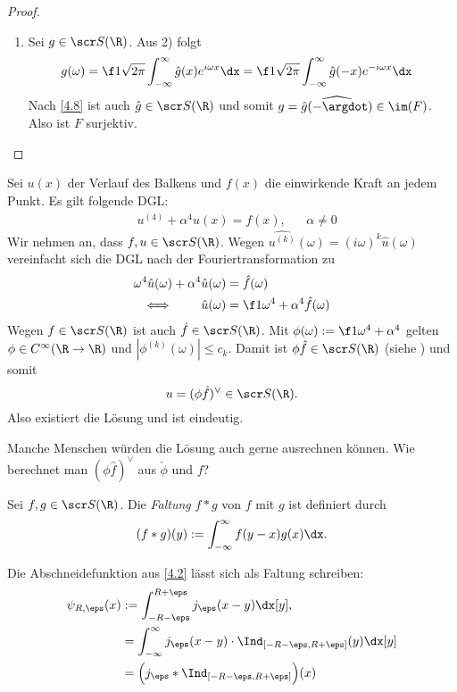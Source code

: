 \begin{st}
\begin{proof}
\begin{enumerate}[1)]
			\item
				Sei $g \in \scr S(\R)$.
				Aus 2) folgt
				\begin{align*}
					g(\omega)
					&= \f 1{\sqrt{2\pi}} \int_{-\infty}^\infty \hat g(x) e^{i\omega x} \dx
					= \f 1{\sqrt{2\pi}} \int_{-\infty}^\infty \hat g(-x) e^{-i\omega x} \dx
				\end{align*}
				Nach \ref{4.8} ist auch $\hat g \in \scr S(\R)$ und somit $g = \widehat{\hat g(- \argdot)} \in \im(F)$.
				Also ist $F$ surjektiv.
		\end{enumerate}
	\end{proof}
\end{st}

\begin{ex} \label{4.11}
	Sei $u(x)$ der Verlauf des Balkens und $f(x)$ die einwirkende Kraft an jedem Punkt.
	Es gilt folgende DGL:
	\begin{align*}
		& u^{(4)} + \alpha^4 u(x) = f(x), &
		& \alpha \neq 0
	\end{align*}
	Wir nehmen an, dass $f, u \in \scr S(\R)$.
	Wegen $\widehat{u^{(k)}}(\omega) = (i\omega)^k \hat u(\omega)$ vereinfacht sich die DGL nach der Fouriertransformation zu
	\begin{align*}
		\omega^4 \hat u(\omega) + \alpha^4 \hat u(\omega) &= \hat f(\omega) \\
		\iff \qquad  \hat u(\omega) &= \f 1{\omega^4 + \alpha^4} \hat f(\omega)
	\end{align*}
	Wegen $f \in \scr S(\R)$ ist auch $\hat f \in \scr S(\R)$.
	Mit $\phi(\omega) := \f 1{\omega^4 + \alpha^4}$ gelten $\phi \in C^\infty (\R \to \R)$ und $|\phi^{(k)}(\omega)| \le c_k$.
	Damit ist $\phi \hat f \in \scr S(\R)$ (siehe ) und somit
	\[
		u = (\phi \hat f)^{\vee} \in \scr S(\R).
	\]
	Also existiert die Lösung und ist eindeutig.

	Manche Menschen würden die Lösung auch gerne ausrechnen können.
	Wie berechnet man $(\phi \hat f)^{\vee}$ aus $\check \phi$ und $f$?
\end{ex}

\begin{df} \label{4.12}
	Sei $f, g \in \scr S(\R)$.
	Die \emph{Faltung} $f \ast g$ von $f$ mit $g$ ist definiert durch
	\[
		(f \ast g)(y) := \int_{-\infty}^\infty f(y-x) g(x) \dx.
	\]
\end{df}

\begin{ex} \label{4.13}
	Die Abschneidefunktion aus \ref{4.2} lässt sich als Faltung schreiben:
	\begin{align*}
		\psi_{R,\eps} (x)
		&:= \int_{-R-\eps}^{R+\eps} j_\eps (x-y) \dx[y], \\
		&= \int_{-\infty}^\infty j_\eps(x-y) \cdot  \Ind_{[-R-\eps,R+\eps]}(y) \dx[y] \\
		&= \Big( j_\eps \ast \Ind_{[-R-\eps, R+\eps]} \Big) (x)
	\end{align*}
\end{ex}

